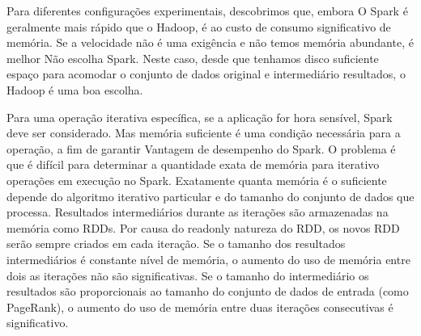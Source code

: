 Para diferentes configurações experimentais, descobrimos que, embora
O Spark é geralmente mais rápido que o Hadoop, é ao custo de
consumo significativo de memória. Se a velocidade não é uma exigência e não temos memória abundante, é melhor
Não escolha Spark. Neste caso, desde que tenhamos disco suficiente
espaço para acomodar o conjunto de dados original e intermediário
resultados, o Hadoop é uma boa escolha.

Para uma operação iterativa específica, se a aplicação for hora
sensível, Spark deve ser considerado. Mas memória suficiente
é uma condição necessária para a operação, a fim de garantir
Vantagem de desempenho do Spark. O problema é que é difícil
para determinar a quantidade exata de memória para iterativo
operações em execução no Spark. Exatamente quanta memória é
o suficiente depende do algoritmo iterativo particular e do
tamanho do conjunto de dados que processa. Resultados intermediários durante
as iterações são armazenadas na memória como RDDs. Por causa do readonly
natureza do RDD, os novos RDD serão sempre criados em
cada iteração. Se o tamanho dos resultados intermediários é constante
nível de memória, o aumento do uso de memória entre dois
as iterações não são significativas. Se o tamanho do intermediário
os resultados são proporcionais ao tamanho do conjunto de dados de entrada (como PageRank), o aumento do uso de memória entre duas iterações consecutivas é significativo.